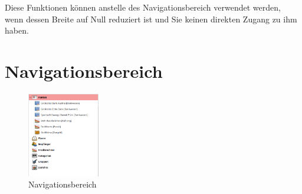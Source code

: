 Diese Funktionen können anstelle des Navigationsbereich verwendet werden, wenn dessen Breite auf Null reduziert ist und Sie keinen direkten Zugang zu ihm haben.%


\section{Navigationsbereich\label{home-accounting}}

\begin{figure}%
\vspace{-\intextsep}				%
\centering							%
\includegraphics[width=0.28\textwidth]{image/screenshot/home_navigation}
\vspace{-5pt}						%
\captionsetup{%
	format=plain,					%
	name=Abb.,						%
	justification=centering,		%
	labelsep=newline				%
}
\caption{Navigationsbereich}		%
\vspace{-40pt}						%
\label{home_navigation}
\end{figure}

